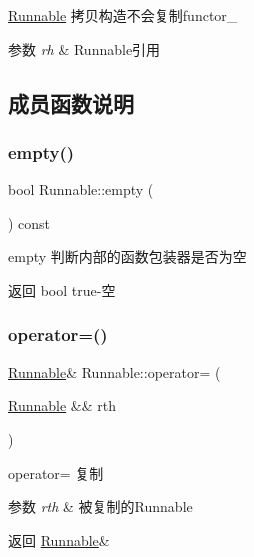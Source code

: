 \hyperlink{classRunnable}{Runnable} 拷贝构造不会复制functor\+\_\+ 


\begin{DoxyParams}{参数}
{\em rh} & Runnable引用 \\
\hline
\end{DoxyParams}


\subsection{成员函数说明}
\mbox{\label{classRunnable_a3abba14a5cf19709cef2d299ee68acae}} 
\subsubsection{\texorpdfstring{empty()}{empty()}}
{\footnotesize\ttfamily bool Runnable\+::empty (\begin{DoxyParamCaption}{ }\end{DoxyParamCaption}) const\hspace{0.3cm}{\ttfamily [inline]}}



empty 判断内部的函数包装器是否为空 

\begin{DoxyReturn}{返回}
bool true-\/空 
\end{DoxyReturn}
\mbox{\label{classRunnable_ab41eea27867a9f54e94255851412bc77}} 
\subsubsection{\texorpdfstring{operator=()}{operator=()}\hspace{0.1cm}{\footnotesize\ttfamily [1/2]}}
{\footnotesize\ttfamily \hyperlink{classRunnable}{Runnable}\& Runnable\+::operator= (\begin{DoxyParamCaption}\item[{\hyperlink{classRunnable}{Runnable} \&\&}]{rth }\end{DoxyParamCaption})\hspace{0.3cm}{\ttfamily [inline]}}



operator= 复制 


\begin{DoxyParams}{参数}
{\em rth} & 被复制的\+Runnable\\
\hline
\end{DoxyParams}
\begin{DoxyReturn}{返回}
\hyperlink{classRunnable}{Runnable}\& 
\end{DoxyReturn}
\mbox{\label{classRunnable_a998834d5321cd0f014dd90f3f8785c02}} 
